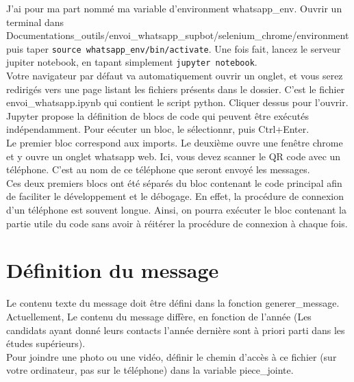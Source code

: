 \documentclass[10pt]{article}
\begin{document}
J'ai pour ma part nommé ma variable d'environment whatsapp\_env. Ouvrir un terminal dans Documentations\_outils/envoi\_whatsapp\_supbot/selenium\_chrome/environment puis taper \texttt{source whatsapp\_env/bin/activate}. Une fois fait, lancez le serveur jupiter notebook, en tapant simplement \texttt{jupyter notebook}.\\

Votre navigateur par défaut va automatiquement ouvrir un onglet, et vous serez redirigés vers une page listant les fichiers présents dans le dossier. C'est le fichier envoi\_whatsapp.ipynb qui contient le script python. Cliquer dessus pour l'ouvrir.\\

Jupyter propose la définition de blocs de code qui peuvent être exécutés indépendamment. Pour eécuter un bloc, le sélectionnr, puis Ctrl+Enter. \\
Le premier bloc correspond aux imports. Le deuxième ouvre une fenêtre chrome et y ouvre un onglet whatsapp web. Ici, vous devez scanner le QR code avec un téléphone. C'est au nom de ce téléphone que seront envoyé les messages.\\
Ces deux premiers blocs ont été séparés du bloc contenant le code principal afin de faciliter le développement et le débogage. En effet, la procédure de connexion d'un téléphone est souvent longue. Ainsi, on pourra exécuter le bloc contenant la partie utile du code sans avoir à réitérer la procédure de connexion à chaque fois.\\


\section{Définition du message}
Le contenu texte du message doit être défini dans la fonction generer\_message. Actuellement, Le contenu du message diffère, en fonction de l'année (Les candidats ayant donné leurs contacts l'année dernière sont à priori parti dans les études supérieurs).\\

Pour joindre une photo ou une vidéo, définir le chemin d'accès à ce fichier (sur votre ordinateur, pas sur le téléphone) dans la variable piece\_jointe.
\end{document}
